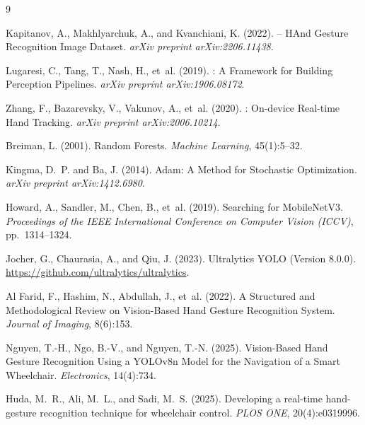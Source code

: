 \documentclass[11pt,a4paper]{article}
\begin{document}

\begin{thebibliography}{9}

Kapitanov, A., Makhlyarchuk, A., and Kvanchiani, K. (2022).
 -- {HAnd Gesture Recognition Image Dataset}.
\newblock \emph{arXiv preprint arXiv:2206.11438}.

Lugaresi, C., Tang, T., Nash, H., et~al. (2019).
: A Framework for Building Perception Pipelines.
\newblock \emph{arXiv preprint arXiv:1906.08172}.

Zhang, F., Bazarevsky, V., Vakunov, A., et~al. (2020).
: On-device Real-time Hand Tracking.
\newblock \emph{arXiv preprint arXiv:2006.10214}.

Breiman, L. (2001).
\newblock Random Forests.
\newblock \emph{Machine Learning}, 45(1):5--32.

Kingma, D.~P. and Ba, J. (2014).
\newblock Adam: A Method for Stochastic Optimization.
\newblock \emph{arXiv preprint arXiv:1412.6980}.

Howard, A., Sandler, M., Chen, B., et~al. (2019).
\newblock Searching for {MobileNetV3}.
\newblock \emph{Proceedings of the IEEE International Conference on Computer Vision (ICCV)}, pp.~1314--1324.

Jocher, G., Chaurasia, A., and Qiu, J. (2023).
\newblock Ultralytics {YOLO} (Version 8.0.0).
\newblock \url{https://github.com/ultralytics/ultralytics}.

Al Farid, F., Hashim, N., Abdullah, J., et~al. (2022).
\newblock A Structured and Methodological Review on Vision-Based Hand Gesture Recognition System.
\newblock \emph{Journal of Imaging}, 8(6):153.

Nguyen, T.-H., Ngo, B.-V., and Nguyen, T.-N. (2025).
\newblock Vision-Based Hand Gesture Recognition Using a {YOLOv8n} Model for the Navigation of a Smart Wheelchair.
\newblock \emph{Electronics}, 14(4):734.

Huda, M.~R., Ali, M.~L., and Sadi, M.~S. (2025).
\newblock Developing a real-time hand-gesture recognition technique for wheelchair control.
\newblock \emph{PLOS ONE}, 20(4):e0319996.

\end{thebibliography}
\end{document}
